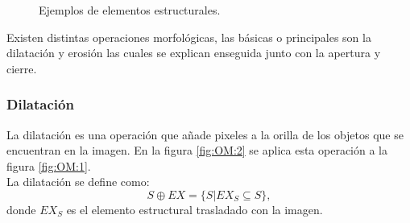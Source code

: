 \begin{figure}[h!]
\centering
{} \qquad
{} \qquad
{} 
\caption{Ejemplos de elementos estructurales.} \label{fig:EX}
\end{figure} 

Existen distintas operaciones morfológicas, las básicas o principales son la dilatación y erosión las cuales se explican enseguida junto con la apertura y cierre. 
 
\subsubsection{Dilatación}\label{sssec:Dilatation}
La dilatación es una operación que añade pixeles a la orilla de los objetos que se encuentran en la imagen. En la figura \ref{fig:OM:2} 
se aplica esta operación a la figura \ref{fig:OM:1}.\\
La dilatación se define como:  
\begin{equation}
S \oplus EX = \lbrace S|EX_S \subseteq S \rbrace,
\end{equation}
donde $EX_S$ es el elemento estructural trasladado con la imagen. 


